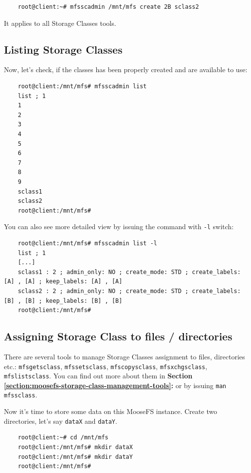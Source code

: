 \documentclass[a4paper,11pt,english]{report}
\def\code#1{\texttt{#1}}
\begin{document}
			\begin{lstlisting}
	root@client:~# mfsscadmin /mnt/mfs create 2B sclass2
			\end{lstlisting}
			
			It applies to all Storage Classes tools.
			
			\pagebreak
			
			\subsection{Listing Storage Classes}
			
			Now, let's check, if the classes has been properly created and are available to use:
			
			\begin{lstlisting}
	root@client:/mnt/mfs# mfsscadmin list
	list ; 1
	1
	2
	3
	4
	5
	6
	7
	8
	9
	sclass1
	sclass2
	root@client:/mnt/mfs#
			\end{lstlisting}
			
			You can also see more detailed view by issuing the command with \code{-l} switch:
			
			\begin{lstlisting}
	root@client:/mnt/mfs# mfsscadmin list -l
	list ; 1
	[...]
	sclass1 : 2 ; admin_only: NO ; create_mode: STD ; create_labels: [A] , [A] ; keep_labels: [A] , [A]
	sclass2 : 2 ; admin_only: NO ; create_mode: STD ; create_labels: [B] , [B] ; keep_labels: [B] , [B]
	root@client:/mnt/mfs#
			\end{lstlisting}
	
			\subsection{Assigning Storage Class to files / directories}
	
			There are several tools to manage Storage Classes assignment to files, directories etc.: \code{mfsgetsclass}, \code{mfssetsclass}, \code{mfscopysclass}, \code{mfsxchgsclass}, \code{mfslistsclass}. You can find out more about them in \textbf{Section \ref{section:moosefs-storage-class-management-tools}:  } or by issuing \code{man mfssclass}.
			
			Now it's time to store some data on this MooseFS instance. Create two directories, let's say \code{dataX} and \code{dataY}.
	
			\begin{lstlisting}
	root@client:~# cd /mnt/mfs
	root@client:/mnt/mfs# mkdir dataX
	root@client:/mnt/mfs# mkdir dataY
	root@client:/mnt/mfs#
			\end{lstlisting}
			
\end{document}
